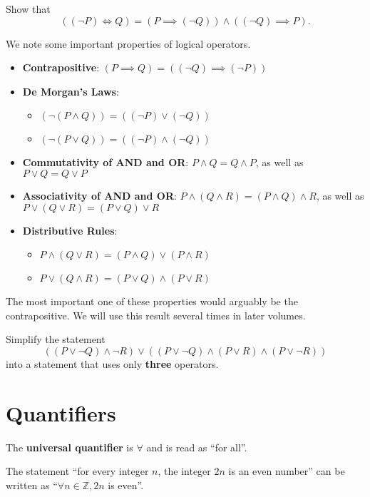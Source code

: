 \begin{exercise}
    Show that
    \[
        ((\lnot P) \iff Q) = (P \implies (\lnot Q)) \land ((\lnot Q) \implies P).
    \]
\end{exercise}

We note some important properties of logical operators.
\begin{itemize}
    \item \textbf{Contrapositive}: $(P \implies Q) = ((\lnot Q) \implies (\lnot P))$
    \item \textbf{De Morgan's Laws}: \begin{itemize}
        \item $(\lnot (P \land Q)) = ((\lnot P) \lor (\lnot Q))$
        \item $(\lnot (P \lor Q)) = ((\lnot P) \land (\lnot Q))$
    \end{itemize}
    \item \textbf{Commutativity of AND and OR}: $P \land Q = Q \land P$, as well as $P \lor Q = Q \lor P$
    \item \textbf{Associativity of AND and OR}: $P \land (Q \land R) = (P \land Q) \land R$, as well as $P \lor (Q \lor R) = (P \lor Q) \lor R$
    \item \textbf{Distributive Rules}: \begin{itemize}
        \item $P \land (Q \lor R) = (P \land Q) \lor (P \land R)$
        \item $P \lor (Q \land R) = (P \lor Q) \land (P \lor R)$
    \end{itemize}
\end{itemize}
\begin{remark}
    The most important one of these properties would arguably be the contrapositive. We will use this result several times in later volumes.
\end{remark}
\begin{exercise}
    Simplify the statement
    \[
        ((P \lor \lnot Q) \land \lnot R) \lor ((P \lor \lnot Q) \land (P \lor R) \land (P \lor \lnot R))
    \]
    into a statement that uses only \textbf{three} operators.
\end{exercise}

\section{Quantifiers}
\begin{definition}
    The \textbf{universal quantifier} is $\forall$ and is read as ``for all''.
\end{definition}
\begin{example}
    The statement ``for every integer $n$, the integer $2n$ is an even number'' can be written as ``$\forall n \in \mathbb{Z}, 2n$ is even''.
\end{example}

